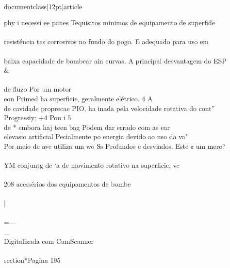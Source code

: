 \\documentclass[12pt]{article}
\begin{document}
phy i necessi ee panes Tequisitos minimos de equipamento de superfide\\
\\
resisténcia tes corrosivos no fundo do pogo. E adequado para uso em\\
\\
balxa capacidade de bombear ain curvas. A principal desvantagem do ESP \\&\\
\\
de fluzo Por um motor\\
eon Primed ha superficie, geralmente elétrico. 4 A\\
de cavidade proprecae PIO, ha inada pela velocidade rotativa do cont”\\
Progressiy; +4 Pou i 5\\
de * embora haj teen bag Podem dar errado com as ear\\
elevasio artificial Pecialmente po energia devido ao uso da va"\\
Por meio de ave utiliza um wo Ss Profundos e desviados. Este ¢ um mero?\\
\\
YM conjuntg de ‘a de movimento rotativo na superficie, ve\\
\\
208 acessérios dos equipamentos de bombe\\
\\
|\\
\\
=—\\_\\
Digitalizada com CamScanner\\

\\section*{Pagina 195}
\end{document}
